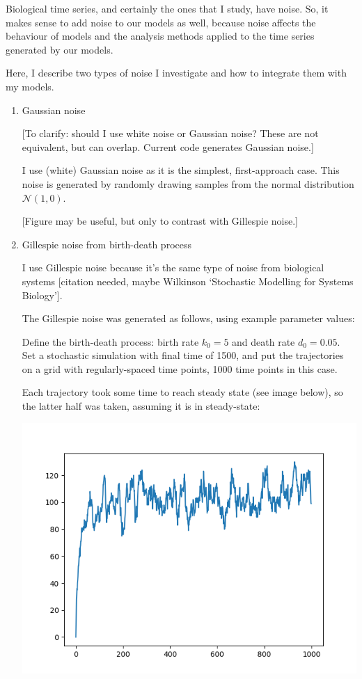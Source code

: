Biological time series, and certainly the ones that I study, have noise.  So, it makes sense to add noise to our models as well, because noise affects the behaviour of models and the analysis methods applied to the time series generated by our models.

Here, I describe two types of noise I investigate and how to integrate them with my models.

\begin{enumerate}
\item Gaussian noise
\label{sec:org38e563f}

[To clarify: should I use white noise or Gaussian noise?  These are not equivalent, but can overlap.  Current code generates Gaussian noise.]

I use (white) Gaussian noise as it is the simplest, first-approach case.  This noise is generated by randomly drawing samples from the normal distribution \(\mathcal{N}(1,0)\).

[Figure may be useful, but only to contrast with Gillespie noise.]

\item Gillespie noise from birth-death process
\label{sec:orge5d486b}

I use Gillespie noise because it's the same type of noise from biological systems [citation needed, maybe Wilkinson `Stochastic Modelling for Systems Biology'].

The Gillespie noise was generated as follows, using example parameter values:

Define the birth-death process: birth rate \(k_{0} = 5\) and death rate \(d_{0} = 0.05\).  Set a stochastic simulation with final time of 1500, and put the trajectories on a grid with regularly-spaced time points, 1000 time points in this case.

Each trajectory took some time to reach steady state (see image below), so the latter half was taken, assuming it is in steady-state:
\begin{center}
\includegraphics[width=.9\linewidth]{gillespie.png}
\end{center}


\end{enumerate}

